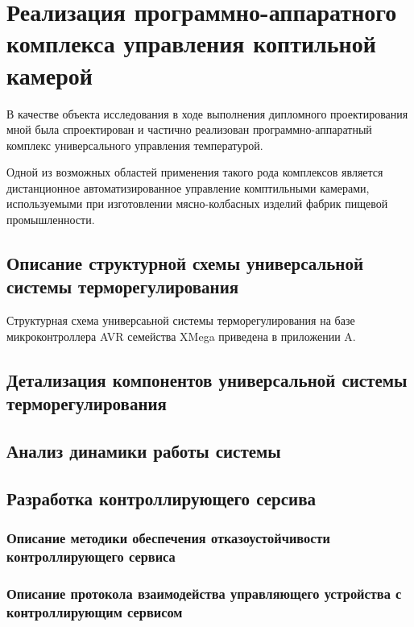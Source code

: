 \section{Реализация программно-аппаратного комплекса управления коптильной камерой}
В качестве объекта исследования в ходе выполнения дипломного проектирования мной
была спроектирован и частично реализован программно-аппаратный комплекс
универсального управления температурой.

Одной из возможных областей применения такого рода комплексов является дистанционное
автоматизированное управление комптильными камерами, используемыми при изготовлении
мясно-колбасных изделий фабрик пищевой промышленности.

\subsection{Описание структурной схемы универсальной системы терморегулирования}
Структурная схема универсаьной системы терморегулирования на базе микроконтроллера
AVR семейства XMega приведена в приложении A.
% 
% 
% 
\subsection{Детализация компонентов универсальной системы терморегулирования}

\subsection{Анализ динамики работы системы}

\subsection{Разработка контроллирующего серсива}

\subsubsection{Описание методики обеспечения отказоустойчивости контроллирующего
сервиса}

\subsubsection{Описание протокола взаимодейства управляющего устройства с
контроллирующим сервисом}

